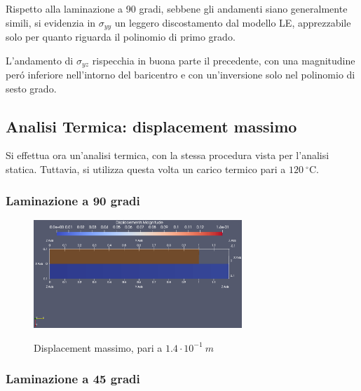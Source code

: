 \documentclass{article}
\begin{document}
            Rispetto alla laminazione a 90 gradi, sebbene gli andamenti siano generalmente simili, si evidenzia in 
            $\sigma_{yy}$ un leggero discostamento dal modello LE, apprezzabile solo per quanto riguarda il polinomio di primo grado.

            L'andamento di $\sigma_{yz}$ rispecchia in buona parte il precedente, con una magnitudine peró inferiore nell'intorno
            del baricentro e con un'inversione solo nel polinomio di sesto grado.

            \clearpage


            \subsection{Analisi Termica: displacement massimo \label{displacement_massimo_thermal}}

            Si effettua ora un'analisi termica, con la stessa procedura vista per l'analisi statica. Tuttavia,
            si utilizza questa volta un carico termico pari a $120 \ _{}^{\circ}\textrm{C}$. 

            \subsubsection{Laminazione a 90 gradi \label{displacement_massimo_90_thermal}}

            \begin{figure}[h!]
                 \label{fig:displacement_90_thermal}
                \centering
                \includegraphics[width=0.7\textwidth]{MUL2/Esercitazione3/MUL2_FEM/OUTPUT/static/Displacement_Z/displacement_thermal_90.eps}
                \caption{Displacement massimo, pari a $1.4 \cdot 10^{-1} \ m$}
            \end{figure}


            \subsubsection{Laminazione a 45 gradi \label{displacement_massimo_45_thermal}}
\end{document}
